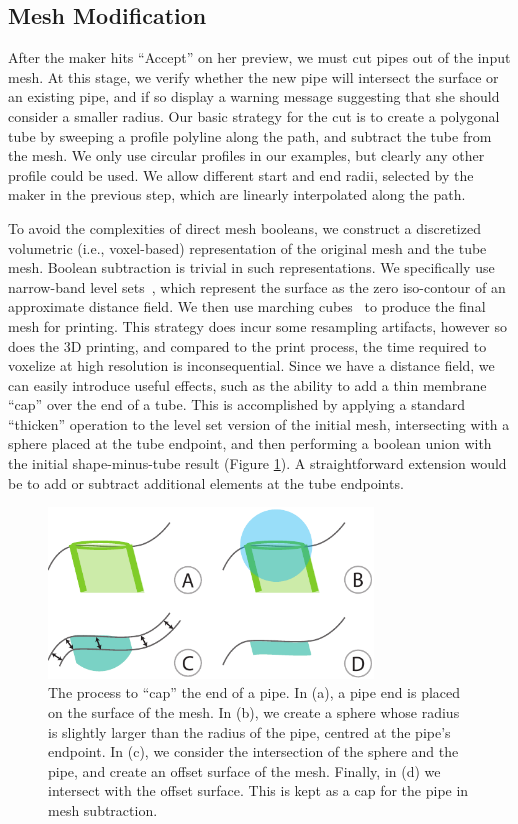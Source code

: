 \subsection{Mesh Modification}
After the maker hits ``Accept'' on her preview, we must cut pipes out of the input mesh.  At this stage, we verify whether the new pipe will intersect the surface or an existing pipe, and if so display a warning message suggesting that she should consider a smaller radius.
Our basic strategy for the cut is to create a polygonal tube by sweeping a profile polyline
along the path, and subtract the tube from the mesh. We only use circular profiles
in our examples, but clearly any other profile could be used. 
We allow different start and end radii, selected by the maker in the previous step, which are linearly interpolated along the path.

To avoid the complexities of direct mesh booleans, we construct a discretized volumetric (i.e., voxel-based) representation of the original mesh and the tube mesh.  Boolean subtraction is trivial in such representations.  We specifically use narrow-band level sets~\cite{Museth04}, which represent the surface as the zero iso-contour of an
approximate distance field.
We then use marching cubes~\cite{Lorensen87} to produce the final mesh for printing.
This strategy does incur some resampling artifacts, however so does the 3D printing, and compared to the print process, the time required to voxelize at high resolution is inconsequential.
Since we have a distance field, we can easily introduce useful effects, such as the
ability to add a thin membrane ``cap'' over the end of a tube. 
This is accomplished by applying a standard ``thicken'' operation to the level set version
of the initial mesh, intersecting with a sphere placed at the tube endpoint, and then performing
a boolean union with the initial shape-minus-tube result (Figure \ref{fig:cap}).
A straightforward extension would be to add or subtract additional elements at
the tube endpoints.

\begin{figure}[t]
\centering
    \includegraphics[width=3.4in]{figures/cap.pdf}
\caption{The process to ``cap'' the end of a pipe.  In (a), a pipe end is placed on the surface of the mesh.  In (b), we create a sphere whose radius is slightly larger than the radius of the pipe, centred at the pipe's endpoint.  In (c), we consider the intersection of the sphere and the pipe, and create an offset surface of the mesh.  Finally, in (d) we intersect with the offset surface.  This is kept as a cap for the pipe in mesh subtraction.}
\label{fig:cap}
\end{figure}

